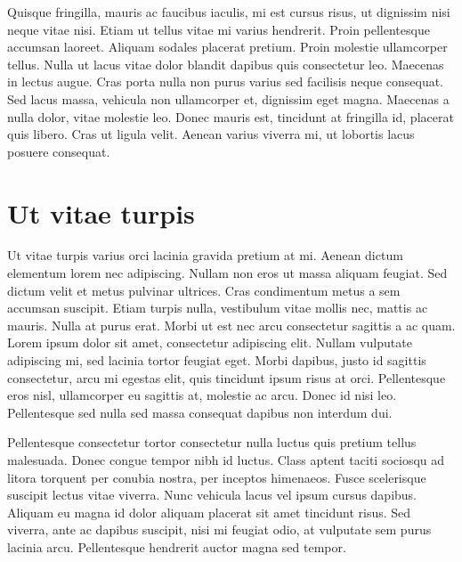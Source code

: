 Quisque fringilla, mauris ac faucibus iaculis, mi est cursus risus, ut dignissim nisi neque vitae nisi. Etiam ut tellus vitae mi varius hendrerit. Proin pellentesque accumsan laoreet. Aliquam sodales placerat pretium. Proin molestie ullamcorper tellus. Nulla ut lacus vitae dolor blandit dapibus quis consectetur leo. Maecenas in lectus augue. Cras porta nulla non purus varius sed facilisis neque consequat. Sed lacus massa, vehicula non ullamcorper et, dignissim eget magna. Maecenas a nulla dolor, vitae molestie leo. Donec mauris est, tincidunt at fringilla id, placerat quis libero. Cras ut ligula velit. Aenean varius viverra mi, ut lobortis lacus posuere consequat.

\section{Ut vitae turpis}
\label{section:lipsum:ut}

Ut vitae turpis varius orci lacinia gravida pretium at mi. Aenean dictum elementum lorem nec adipiscing. Nullam non eros ut massa aliquam feugiat. Sed dictum velit et metus pulvinar ultrices. Cras condimentum metus a sem accumsan suscipit. Etiam turpis nulla, vestibulum vitae mollis nec, mattis ac mauris. Nulla at purus erat. Morbi ut est nec arcu consectetur sagittis a ac quam. Lorem ipsum dolor sit amet, consectetur adipiscing elit. Nullam vulputate adipiscing mi, sed lacinia tortor feugiat eget. Morbi dapibus, justo id sagittis consectetur, arcu mi egestas elit, quis tincidunt ipsum risus at orci. Pellentesque eros nisl, ullamcorper eu sagittis at, molestie ac arcu. Donec id nisi leo. Pellentesque sed nulla sed massa consequat dapibus non interdum dui.

Pellentesque consectetur tortor consectetur nulla luctus quis pretium tellus malesuada. Donec congue tempor nibh id luctus. Class aptent taciti sociosqu ad litora torquent per conubia nostra, per inceptos himenaeos. Fusce scelerisque suscipit lectus vitae viverra. Nunc vehicula lacus vel ipsum cursus dapibus. Aliquam eu magna id dolor aliquam placerat sit amet tincidunt risus. Sed viverra, ante ac dapibus suscipit, nisi mi feugiat odio, at vulputate sem purus lacinia arcu. Pellentesque hendrerit auctor magna sed tempor.


